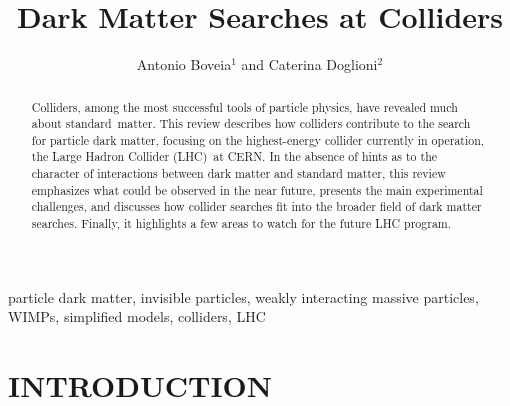 \documentclass{ar-1col}
\begin{document}

\title{Dark Matter Searches at Colliders}

\author{Antonio Boveia$^1$ and Caterina Doglioni$^2$
 }

\begin{abstract}

Colliders, among the most successful tools of particle physics,
have revealed much about standard\ matter. This review describes how
colliders contribute to the search for particle dark matter,
focusing on the highest-energy collider currently in operation,
the Large Hadron Collider (LHC)\ at CERN. In the absence of hints as to the character
of interactions between dark matter and standard matter, this review emphasizes what could be observed in the
near future, presents the main experimental challenges, and discusses how
collider searches fit into the broader field of dark matter searches. Finally, it
highlights a few areas to watch for the future LHC program.
\end{abstract}

\begin{keywords}
particle dark matter, invisible particles, weakly interacting
massive particles, WIMPs, simplified models, colliders, LHC
\end{keywords}

\maketitle

\tableofcontents

\section{INTRODUCTION}\label{sec:intro}
\end{document}

